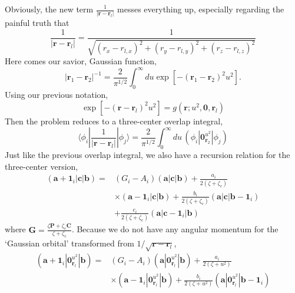 \documentclass[12pt,a4paper,openany,twoside]{article}
\numberwithin{equation}{section}
\begin{document}
Obviously, the new term $\frac{1}{|\boldsymbol{r} - \boldsymbol{r}_l|}$ messes everything up, especially regarding the painful truth that
\begin{equation}
    \frac{1}{|\boldsymbol{r} - \boldsymbol{r}_l| } = \frac{1}{\sqrt{(r_x - r_{l,x})^2 + (r_{y} - r_{l,y})^2 + (r_{z} - r_{l,z})^2}}
\end{equation}
Here comes our savior, Gaussian function,
\begin{equation}
    \left|\boldsymbol{r}_{1}-\boldsymbol{r}_{2}\right|^{-1}=\frac{2}{\pi^{1 / 2}} \int_{0}^{\infty} d u \exp \left[-\left(\boldsymbol{r}_{1}-\boldsymbol{r}_{2}\right)^{2} u^{2}\right].
\end{equation}
Using our previous notation,
\begin{equation}
    \exp \left[-\left(\boldsymbol{r}-\boldsymbol{r}_{l}\right)^{2} u^{2}\right] = g(\boldsymbol{r};u^2,\boldsymbol{0},\boldsymbol{r}_l)
\end{equation}
Then the problem reduces to a three-center overlap integral,
\begin{equation}
    \langle \phi_i | \frac{1}{|\boldsymbol{r} - \boldsymbol{r}_l|} |\phi_j \rangle = \frac{2}{\pi^{1 / 2}} \int_0^\infty du \, (\phi_i|\boldsymbol{0}_{\boldsymbol{r}_2}^{u^2}|\phi_j)
\end{equation}
Just like the previous overlap integral, we also have a recursion relation for the three-center version,
\begin{equation}
\begin{aligned}
    \left(\boldsymbol{a}+\boldsymbol{1}_{i}|\boldsymbol{c}| \boldsymbol{b}\right)=&\left(G_{i}-A_{i}\right)(\boldsymbol{a}|\boldsymbol{c}| \boldsymbol{b})+\frac{a_i}{2\left(\zeta+\zeta_{c}\right)} \\ 
& \times \left(\boldsymbol{a}-\boldsymbol{1}_{i}|\boldsymbol{c}| \boldsymbol{b}\right)+\frac{ b_i}{2\left(\zeta+\zeta_{c}\right)} \left(\boldsymbol{a} | \boldsymbol{c}|\boldsymbol{b}-\boldsymbol{1}_{i}\right)\\ 
&+\frac{c_i}{2\left(\zeta+\zeta_{c}\right)}\left(\boldsymbol{a}\left|\boldsymbol{c}-\boldsymbol{1}_{i}\right| \boldsymbol{b}\right)
\end{aligned}
\end{equation}
where $\boldsymbol{G}=\frac{\zeta \boldsymbol{P}+\zeta_{c} \boldsymbol{C}}{\zeta+\zeta_{c}}$. Because we do not have any angular momentum for the `Gaussian orbital' transformed from $1/\sqrt{\boldsymbol{r} - \boldsymbol{r}_l}$,
\begin{equation}
    \begin{aligned}
    \left(\boldsymbol{a}+\boldsymbol{1}_{i}|\boldsymbol{0}_{\boldsymbol{r}_l}^{u^2}| \boldsymbol{b}\right)= & \left(G_{i}-A_{i}\right)(\boldsymbol{a}|\boldsymbol{0}_{\boldsymbol{r}_l}^{u^2}| \boldsymbol{b})+\frac{a_i}{2\left(\zeta + u^2\right)} \\ 
    & \times \left(\boldsymbol{a}-\boldsymbol{1}_{i}|\boldsymbol{0}_{\boldsymbol{r}_l}^{u^2}| \boldsymbol{b}\right)+\frac{ b_i}{2\left(\zeta + u^2\right)} \left(\boldsymbol{a} | \boldsymbol{0}_{\boldsymbol{r}_l}^{u^2}|\boldsymbol{b}-\boldsymbol{1}_{i}\right)
    \end{aligned}
\end{equation}
\end{document}
